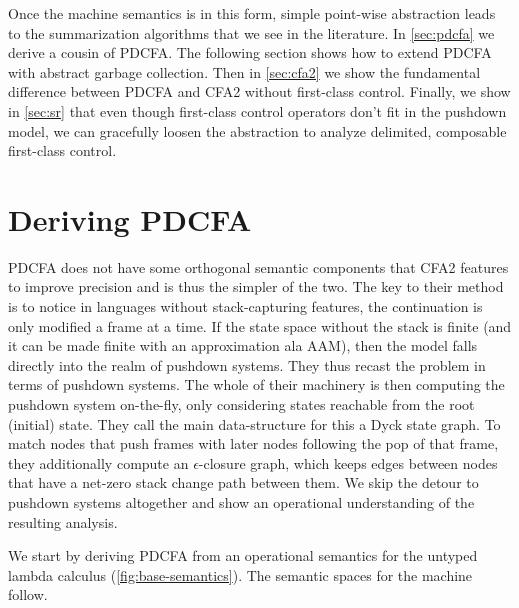 
Once the machine semantics is in this form, simple point-wise abstraction leads to the summarization algorithms that we see in the literature.
%
In \autoref{sec:pdcfa} we derive a cousin of PDCFA.
%
The following section shows how to extend PDCFA with abstract garbage collection. %
%
Then in \autoref{sec:cfa2} we show the fundamental difference between PDCFA and CFA2 without first-class control. %
%
%
Finally, we show in \autoref{sec:sr} that even though first-class control operators don't fit in the pushdown model, we can gracefully loosen the abstraction to analyze delimited, composable first-class control.

\section{Deriving PDCFA}
\label{sec:pdcfa}

PDCFA does not have some orthogonal semantic components that CFA2 features to improve precision and is thus the simpler of the two.
%
The key to their method is to notice in languages without stack-capturing features, the continuation is only modified a frame at a time.
%
If the state space without the stack is finite (and it can be made finite with an approximation ala AAM), then the model falls directly into the realm of pushdown systems.
%
They thus recast the problem in terms of pushdown systems.
%
The whole of their machinery is then computing the pushdown system on-the-fly, only considering states reachable from the root (initial) state.
%
They call the main data-structure for this a Dyck state graph.
%
To match nodes that push frames with later nodes following the pop of that frame, they additionally compute an $\epsilon$-closure graph, which keeps edges between nodes that have a net-zero stack change path between them.
%
We skip the detour to pushdown systems altogether and show an operational understanding of the resulting analysis.

We start by deriving PDCFA from an operational semantics for the untyped lambda calculus (\autoref{fig:base-semantics}).
%
The semantic spaces for the machine follow.

